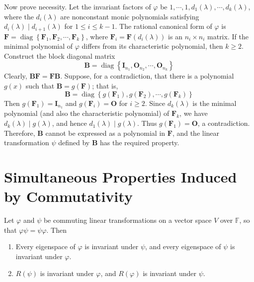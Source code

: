 \documentclass[12pt, a4paper, oneside]{book}
\begin{document}
\begin{theorem}
    Now prove necessity. Let the invariant factors of $\varphi$ be $1, \cdots, 1, d_1(\lambda), \cdots, d_k(\lambda)$, where the $d_i(\lambda)$ are nonconstant monic polynomials satisfying $d_i(\lambda) \mid d_{i+1}(\lambda)$ for $1 \leq i \leq k-1$. The rational canonical form of ${\varphi}$ is $\mathbf{F}=\operatorname{diag}\left\{\mathbf{F}_1, \mathbf{F}_2, \cdots, \mathbf{F}_k\right\}$, where $\mathbf{F}_i=\mathbf{F}\left(d_i(\lambda)\right)$ is an $n_i \times n_i$ matrix. If the minimal polynomial of ${\varphi}$ differs from its characteristic polynomial, then $k \geq 2$. Construct the block diagonal matrix
    \[
        \mathbf{B}=\operatorname{diag}\left\{\mathbf{I}_{n_1}, \mathbf{O}_{n_2}, \cdots, \mathbf{O}_{n_k}\right\}
    \]
    Clearly, ${\mathbf{B} \mathbf{F}}=\mathbf{F} \mathbf{B}$. Suppose, for a contradiction, that there is a polynomial $g(x)$ such that $\mathbf{B}=g(\mathbf{F})$; that is,
    \[
        \mathbf{B}=\operatorname{diag}\left\{g\left(\mathbf{F}_1\right), g\left(\mathbf{F}_2\right), \cdots, g\left(\mathbf{F}_k\right)\right\}
    \]
    Then $g\left(\mathbf{F}_1\right)=\mathbf{I}_{n_1}$ and $g\left(\mathbf{F}_i\right)=\mathbf{O}$ for $i \geq 2$. Since $d_k(\lambda)$ is the minimal polynomial (and also the characteristic polynomial) of $\mathbf{F}_k$, we have $d_k(\lambda) \mid g(\lambda)$, and hence $d_1(\lambda) \mid g(\lambda)$. Thus $g\left(\mathbf{F}_1\right)=\mathbf{O}$, a contradiction. Therefore, $\mathbf{B}$ cannot be expressed as a polynomial in $\mathbf{F}$, and the linear transformation $\psi$ defined by $\mathbf{B}$ has the required property.
\end{theorem}












\section{Simultaneous Properties Induced by Commutativity}


\begin{theorem}
    Let $\varphi$ and $\psi$ be commuting linear transformations on a vector space $V$ over $\mathbb{F}$, so that $\varphi \psi=\psi \varphi$. Then
    \begin{enumerate}
        \item Every eigenspace of $\varphi$ is invariant under $\psi$, and every eigenspace of $\psi$ is invariant under $\varphi$.


        \item $R(\psi)$ is invariant under $\varphi$, and $R(\varphi)$ is invariant under $\psi$.
    \end{enumerate}
\end{theorem}
\end{document}
